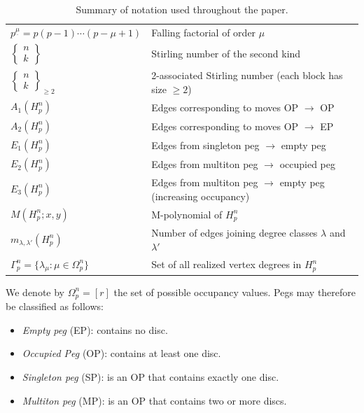 \documentclass[letterpaper,12pt]{article}
\begin{document}
\begin{table}[H]
{\begin{tabular}{ll}
$p^{\underline{\mu}} = p(p-1)\cdots(p-\mu+1)$ 
& Falling factorial of order $\mu$ \\

$\begin{Bmatrix} n \\ k \end{Bmatrix}$ 
& Stirling number of the second kind \\

$\begin{Bmatrix} n \\ k \end{Bmatrix}_{\ge 2}$ 
& 2-associated Stirling number (each block has size $\ge 2$) \\

\midrule

$A_1(H_p^n)$ 
& Edges corresponding to moves OP $\to$ OP \\

$A_2(H_p^n)$ 
& Edges corresponding to moves OP $\to$ EP \\

$E_1(H_p^n)$ 
& Edges from singleton peg $\to$ empty peg \\

$E_2(H_p^n)$ 
& Edges from multiton peg $\to$ occupied peg \\

$E_3(H_p^n)$ 
& Edges from multiton peg $\to$ empty peg (increasing occupancy) \\

\midrule

$M(H_p^n; x, y)$ 
& M-polynomial of $H_p^n$ \\

$m_{\lambda,\lambda'}(H_p^n)$ 
& Number of edges joining degree classes $\lambda$ and $\lambda'$ \\

$\Gamma_p^n = \{\lambda_\mu : \mu \in \Omega_p^n\}$ 
& Set of all realized vertex degrees in $H_p^n$ \\

\bottomrule
\end{tabular}
}
\caption{Summary of notation used throughout the paper.}
\label{tab:notation}
\end{table}
 

 We denote by \(\Omega_p^n = [r]\) the set of possible occupancy values.  Pegs may therefore be classified as follows:
\begin{itemize}
    \item \textit{Empty peg } (EP): contains no disc.
    \item \textit{Occupied Peg} (OP): contains at least one disc.
    \item \textit{Singleton peg } (SP): is an OP that contains exactly one disc.
    \item \textit{Multiton peg } (MP): is an OP that contains two or more discs.
   
\end{itemize}
\end{document}
